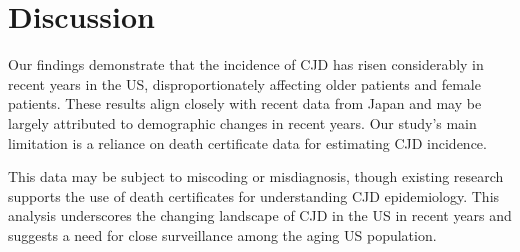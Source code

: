 \documentclass[12pt]{article}
\begin{document}
\newpage

\begin{table}[ht]
\centering
\caption{Joinpoint Analysis: Creutzfeldt--Jakob Disease Mortality, by Demographics}
\label{table:joinpoint-analysis}
\end{table}

\newpage

\section*{Discussion}
 
\par \bigskip
\noindent Our findings demonstrate that the incidence of CJD has risen considerably in recent years in the US, disproportionately affecting older patients and female patients. These results align closely with recent data from Japan and may be largely attributed to demographic changes in recent years\cite{SciRep}. Our study’s main limitation is a reliance on death certificate data for estimating CJD incidence.

\par \bigskip
\noindent This data may be subject to miscoding or misdiagnosis, though existing research supports the use of death certificates for understanding CJD epidemiology\cite{NeuroEpi}. This analysis underscores the changing landscape of CJD in the US in recent years and suggests a need for close surveillance among the aging US population.  




\end{document}
